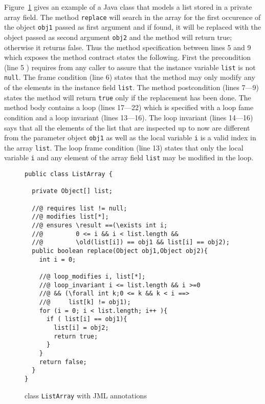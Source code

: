 \documentclass[a4paper]{llncs}
\begin{document}
     
Figure~\ref{replaceSrc} gives an example of a Java class that models a list stored in a private array field. 
The method \texttt{replace} will search in the array for the first occurence of the object \texttt{obj1} passed as first argument
 and if found, it will be replaced with the object passed as second argument \texttt{obj2} and the method will return true; otherwise it 
returns false. Thus the method  specification between lines 5 and 9 which exposes the method contract states the following.
First the precondition (line 5 ) requires from any caller to assure that the instance variable \texttt{list} is not \texttt{null}.
The frame condition (line  6) states that the method may only
modify any of the elements in the instance field \texttt{list}. The method postcondition (lines 7---9) states the method will return 
\texttt{true} only if  the replacement has been done.
The method body contains a loop (lines 17---22) which is specified with a loop fame condition and a loop invariant (lines 13---16).
  The loop invariant (lines 14---16) says that all the elements of the list that are inspected up to now are 
different from the parameter object \texttt{obj1} as well as the local variable \texttt{i}  is a valid index in the array \texttt{list}.
The loop frame condition (line 13)  states that only
 the local variable \texttt{i} and any element of the array field \texttt{list} may be modified in the loop.

\lstset{numbers=left,numberstyle=\small,stepnumber=1,numbersep=5pt}
\begin{figure}[ht!]
\begin{lstlisting}[frame=trbl] 
public class ListArray {
  
  private Object[] list;
  
  //@ requires list != null;
  //@ modifies list[*];
  //@ ensures \result ==(\exists int i; 
  //@         0 <= i && i < list.length && 
  //@         \old(list[i]) == obj1 && list[i] == obj2);
  public boolean replace(Object obj1,Object obj2){
    int i = 0;
    
    //@ loop_modifies i, list[*];
    //@ loop_invariant i <= list.length && i >=0 
    //@ && (\forall int k;0 <= k && k < i ==> 
    //@     list[k] != obj1);
    for (i = 0; i < list.length; i++ ){
      if ( list[i] == obj1){
        list[i] = obj2;
        return true;	
      }
    }
    return false;
  }
}
\end{lstlisting}
\caption{\sc class \mbox{\rm \lstinline!ListArray!} with JML annotations} 
\label{replaceSrc}
\end{figure}
\end{document}
